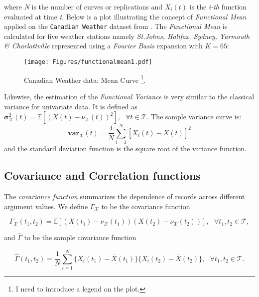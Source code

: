 where \textit{N} is the number of curves or replications and $X_{i}(t)$ is the \textit{i-th} function evaluated at time \textit{t}. Below is a plot illustrating the concept of \textit{Functional Mean} applied on the \texttt{Canadian Weather} dataset from \cite{olberd:ramsay}. The \textit{Functional Mean} is calculated for five weather stations namely \textit{St.Johns, Halifax, Sydney, Yarmouth \& Charlottville} represented using a \textit{Fourier Basis} expansion with $K = 65$:
\begin{figure}[h]
  \centering
    \texttt{[image: Figures/functionalmean1.pdf]}
  \caption[\textit{Functional Mean} applied on Canadian Weather dataset]{Canadian Weather data: Mean Curve \footnote{I need to introduce a legend on the plot.}.}
  \label{fig:meancurve}
\end{figure}

Likewise, the estimation of the \textit{Functional Variance} is very similar to the classical variance for univariate data. It is defined as $\mathbf{\sigma}^{2}_{\mathcal{X}}(t)=\mathbb{E}\left[(X(t)-\nu_{\mathcal{X}}(t))^{2}\right],\text{ }\forall t \in \mathcal{T}$.  The sample variance curve is:
\begin{equation}
\textbf{var}_{\mathcal{X}}(t)=\dfrac{1}{N}\sum\limits_{i=1}^{N}\left[X_{i}(t)-\bar{X}(t)\right]^{2}
\end{equation}
and the standard deviation function is the square root of the variance function.

\subsection{Covariance and Correlation functions}
The \textit{covariance function} summarizes the dependence of records across different argument values. We define $\Gamma_{\mathcal{X}}$ to be the covariance function

\begin{equation*}
\Gamma_{\mathcal{X}}(t_{1},t_{2})=\mathbb{E}\left[(X(t_{1})-\nu_{\mathcal{X}}(t_{1}))(X(t_{2})-\nu_{\mathcal{X}}(t_{2}))\right], \text{ } \forall t_{1},t_{2} \in \mathcal{T},
\end{equation*}

and $\hat{\Gamma}$ to be the sample covariance function

\begin{equation}\label{covar}
\hat{\Gamma}(t_{1},t_{2})=\frac{1}{N}\sum\limits_{i=1}^{N}\{X_{i}(t_{1})-\bar{X}(t_{1})\}\{X_{i}(t_{2})-\bar{X}(t_{2})\},  \text{ } \forall t_{1},t_{2} \in \mathcal{T}.
\end{equation}

